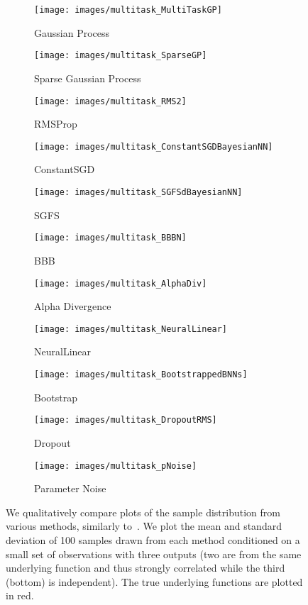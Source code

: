 \documentclass{article} \usepackage{iclr2018_conference,times}
\begin{document}
\begin{figure}[ht]
\advance\leftskip-1.6cm
\begin{subfigure}[t]{0.40\textwidth}\centering
 \texttt{[image: images/multitask\_MultiTaskGP]}
 \caption{Gaussian Process}
 \label{fig:gp}
\end{subfigure}\begin{subfigure}[t]{.40\textwidth}
 \centering
 \texttt{[image: images/multitask\_SparseGP]}
 \caption{Sparse Gaussian Process}
 \end{subfigure}\begin{subfigure}[t]{.40\textwidth}
 \centering
 \texttt{[image: images/multitask\_RMS2]}
 \caption{RMSProp}
 \label{fig:rmsprop}
\end{subfigure}
\begin{subfigure}[t]{.40\textwidth}
 \centering
 \texttt{[image: images/multitask\_ConstantSGDBayesianNN]}
 \caption{ConstantSGD}
 \label{fig:constsgd}
\end{subfigure}\begin{subfigure}[t]{.40\textwidth}
 \centering
 \texttt{[image: images/multitask\_SGFSdBayesianNN]}
 \caption{SGFS}
 \label{fig:sgfs}
\end{subfigure}\begin{subfigure}[t]{.40\textwidth}
 \centering
 \texttt{[image: images/multitask\_BBBN]}
 \caption{BBB}
 \label{fig:sgfs}
\end{subfigure}
\begin{subfigure}[t]{.40\textwidth}
 \centering
 \texttt{[image: images/multitask\_AlphaDiv]}
 \caption{Alpha Divergence}
 \end{subfigure}\begin{subfigure}[t]{.40\textwidth}
 \centering
 \texttt{[image: images/multitask\_NeuralLinear]}
 \caption{NeuralLinear}
 \label{fig:sgfs}
\end{subfigure}\begin{subfigure}[t]{.40\textwidth}
 \centering
 \texttt{[image: images/multitask\_BootstrappedBNNs]}
 \caption{Bootstrap}
 \label{fig:sgfs}
\end{subfigure}
\begin{subfigure}[t]{.40\textwidth}
 \centering
 \texttt{[image: images/multitask\_DropoutRMS]}
 \caption{Dropout}
 \label{fig:sgfs}
\end{subfigure}\begin{subfigure}[t]{.40\textwidth}
 \centering
 \texttt{[image: images/multitask\_pNoise]}
 \caption{Parameter Noise}
 \label{fig:sgfs}
\end{subfigure}\caption{We qualitatively compare plots of the sample distribution from various methods, similarly to~\cite{Hernandez-Lobato2016}.  We plot the mean and standard deviation of 100 samples drawn from each method conditioned on a small set of observations with three outputs (two are from the same underlying function and thus strongly correlated while the third (bottom) is independent).  The true underlying functions are plotted in red.}
\label{fig:qualitative_plots}
\end{figure}
\end{document}
